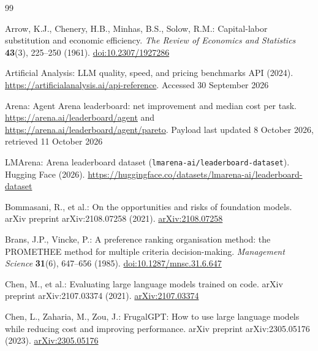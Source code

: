 \documentclass[pdflatex,sn-mathphys-num]{sn-jnl}
\theoremstyle{thmstyleone}
\theoremstyle{thmstylethree}
\begin{document}
\clearpage
\FloatBarrier



\clearpage
\FloatBarrier

\begin{thebibliography}{99}

Arrow, K.J., Chenery, H.B., Minhas, B.S., Solow, R.M.: Capital-labor substitution and economic efficiency. \emph{The Review of Economics and Statistics} \textbf{43}(3), 225--250 (1961). \href{https://doi.org/10.2307/1927286}{doi:10.2307/1927286}

Artificial Analysis: LLM quality, speed, and pricing benchmarks API (2024). \href{https://artificialanalysis.ai/api-reference}{https://artificialanalysis.ai/api-reference}. Accessed 30 September 2026

Arena: Agent Arena leaderboard: net improvement and median cost per task. \href{https://arena.ai/leaderboard/agent}{https://arena.ai/leaderboard/agent} and \href{https://arena.ai/leaderboard/agent/pareto}{https://arena.ai/leaderboard/agent/pareto}. Payload last updated 8 October 2026, retrieved 11 October 2026

LMArena: Arena leaderboard dataset (\texttt{lmarena-ai/leaderboard-dataset}). Hugging Face (2026). \href{https://huggingface.co/datasets/lmarena-ai/leaderboard-dataset}{https://huggingface.co/datasets/lmarena-ai/leaderboard-dataset}

Bommasani, R., et al.: On the opportunities and risks of foundation models. arXiv preprint arXiv:2108.07258 (2021). \href{https://arxiv.org/abs/2108.07258}{arXiv:2108.07258}

Brans, J.P., Vincke, P.: A preference ranking organisation method: the PROMETHEE method for multiple criteria decision-making. \emph{Management Science} \textbf{31}(6), 647--656 (1985). \href{https://doi.org/10.1287/mnsc.31.6.647}{doi:10.1287/mnsc.31.6.647}

Chen, M., et al.: Evaluating large language models trained on code. arXiv preprint arXiv:2107.03374 (2021). \href{https://arxiv.org/abs/2107.03374}{arXiv:2107.03374}

Chen, L., Zaharia, M., Zou, J.: FrugalGPT: How to use large language models while reducing cost and improving performance. arXiv preprint arXiv:2305.05176 (2023). \href{https://arxiv.org/abs/2305.05176}{arXiv:2305.05176}


\end{thebibliography}
\end{document}
